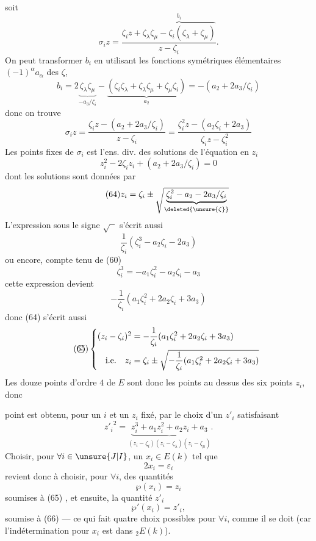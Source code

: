 soit
\[
\tag{61}
\sigma_i z=\frac{\zeta_i z+\overbrace{\zeta_\lambda\zeta_\mu-\zeta_i(\zeta_\lambda+\zeta_\mu)}^{b_i}}{z-\zeta_i}.
\]
On peut transformer $b_i$ en utilisant les fonctions symétriques élémentaires $(-1)^\alpha a_\alpha$ des $\zeta$,
\[
b_i=2\underbrace{\zeta_\lambda\zeta_\mu}_{-a_3/\zeta_i}-\underbrace{(\zeta_i\zeta_\lambda+\zeta_\lambda\zeta_\mu+\zeta_\mu\zeta_i)}_{a_2}=-(a_2+2a_3/\zeta_i)
\]
donc on trouve
\[
\tag{62}
\sigma_i z=\frac{\zeta_i z-(a_2+2a_3/\zeta_i)}{z-\zeta_i}=\frac{\zeta_i^2z-(a_2\zeta_i+2a_3)}{\zeta_i z-\zeta_i^2}
\]
Les  points fixes de $\sigma_i$ est l'ens. div. des solutions de l'équation en $z_i$
\[
\tag{63}
z_i^2-2\zeta_i z_i+(a_2+2a_3/\zeta_i)=0
\]
dont les solutions sont données par
\[
\tag{64}
z_i=\zeta_i\pm\sqrt{\underbrace{\zeta_i^2-a_2-2a_3/\zeta_i}_{\deleted{\unsure{\zeta}}}}
\]
L'expression sous le signe $\sqrt{\phantom{x}}$ s'écrit aussi
\[
\frac{1}{\zeta_i}(\zeta_i^3-a_2\zeta_i-2a_3)
\]
ou encore, compte tenu de (60)
\[
\zeta_i^3=-a_1\zeta_i^2-a_2\zeta_i-a_3
\]
 cette expression devient
\[
-\frac{1}{\zeta_i}(a_1\zeta_i^2+2a_2\zeta_i+3a_3)
\]
donc (64) s'écrit aussi
\[
\tag{\textcircled{65}}
\left\{\begin{aligned}
(z_i-\zeta_i)^2&=-\frac{1}{\zeta_i}(a_1\zeta_i^2+2a_2\zeta_i+3a_3)\\
\text{i.e.}\quad z_i&=\zeta_i\pm\sqrt{-\frac{1}{\zeta_i}(a_1\zeta_i^2+2a_2\zeta_i+3a_3)}
\end{aligned}\right.
\]
Les douze points d'ordre $4$ de $E$ sont donc les points au dessus des six points $z_i$, donc  

point est obtenu, pour un $i$ et un $z_i$ fixé, par le choix d'un $z'_i$ satisfaisant
\[
\tag{66}
{z'_i}^2=\underbrace{z_i^3+a_1z_i^2+a_2z_i+a_3}_{(z_i-\zeta_i)(z_i-\zeta_\lambda)(z_i-\zeta_\mu)}.
\]
Choisir, pour $\forall i\in\unsure{J|I}$, un $x_i\in E(k)$ tel que
\[
\tag{67}
2x_i=\varepsilon_i
\]
revient donc à choisir, pour $\forall i$, des quantités
\[
\tag{68a}
\wp(x_i)=z_i
\]
soumises à (65) , et ensuite, la quantité $z'_i$
\[
\tag{68b}
\wp'(x_i)=z'_i,
\]
soumise à (66) --- ce qui fait quatre choix possibles pour $\forall i$, comme il se doit (car l'indétermination pour $x_i$ est dans $ {}_2E(k)$).

